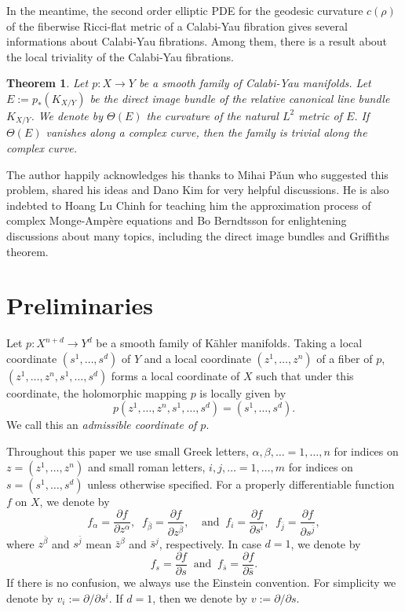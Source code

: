 \documentclass{amsart}
\newtheorem{theorem}{Theorem}[section]
\theoremstyle{definition}
\numberwithin{equation}{section}
\begin{document}
In the meantime, the second order elliptic PDE for the geodesic curvature $c(\rho)$ of the fiberwise Ricci-flat metric of a Calabi-Yau fibration gives several informations about Calabi-Yau fibrations. 
Among them, there is a result about the local triviality of the Calabi-Yau fibrations.

\begin{theorem}
Let $p:X\rightarrow Y$ be a smooth family of Calabi-Yau manifolds. Let $E:=p_*(K_{X/Y})$ be the direct image bundle of the relative canonical line bundle $K_{X/Y}$. We denote by $\Theta(E)$ the curvature of the natural $L^2$ metric of $E$. If $\Theta(E)$ vanishes along a  complex curve, then the family is trivial along the complex curve.
\end{theorem}

The author happily acknowledges his thanks to Mihai P\v aun who suggested this problem, shared his ideas and Dano Kim for very helpful discussions. He is also indebted to Hoang Lu Chinh for teaching him the approximation process of complex Monge-Amp\`ere equations and Bo Berndtsson for enlightening discussions about many topics, including the direct image bundles and Griffiths theorem. 

\section{Preliminaries}

Let $p:X^{n+d}\rightarrow Y^d$ be a smooth family of K\"ahler manifolds. Taking a local coordinate $(s^1,\dots,s^d)$ of $Y$ and a local coordinate $(z^1,\dots,z^n)$ of a fiber of $p$, $(z^1,\dots,z^n,s^1,\dots,s^d)$ forms a local coordinate of $X$ such that under this coordinate, the holomorphic mapping $p$ is locally given by
\begin{equation*}
p(z^1,\dots,z^n,s^1,\dots,s^d)
=
(s^1,\dots,s^d).
\end{equation*}
We call this an \emph{admissible coordinate of $p$}.

Throughout this paper we use  small Greek letters, $\alpha,\beta,\dots=1,\dots,n$ for indices on $z=(z^1,\dots,z^n)$ and small roman letters, $i,j,\dots=1,\dots,m$ for indices on $s=(s^1,\dots,s^d)$ unless otherwise specified. For a properly differentiable function $f$ on $X$, we denote by
\begin{equation} \label{E:convention}
f_\alpha
    ={\frac{\partial{f}}{\partial{z^\alpha}}},\;\;
f_{\bar\beta}
    ={\frac{\partial{f}}{\partial{z^{\bar\beta}}}},\;\;
   \;\;\text{and}\;\;
f_{i}
    ={\frac{\partial{f}}{\partial{s^i}}},\;\;
f_{\bar{j}}
    ={\frac{\partial{f}}{\partial{s^{\bar{j}}}}},
\end{equation}
where $z^{\bar\beta}$ and $s^{\bar{j}}$ mean $\bar{z}^\beta$ and $\bar{s}^j$, respectively. In case $d=1$, we denote by
\begin{equation*}
f_{s}
	={\frac{\partial{f}}{\partial{s}}}\;\;
\text{and}\;\;
f_{\bar{s}}
	={\frac{\partial{f}}{\partial{\bar{s}}}}.
\end{equation*}
If there is no confusion, we always use the Einstein convention. For simplicity we denote by $v_i:=\partial/\partial{s^i}$. If $d=1$, then we denote by $v:=\partial/\partial{s}$.
\end{document}
